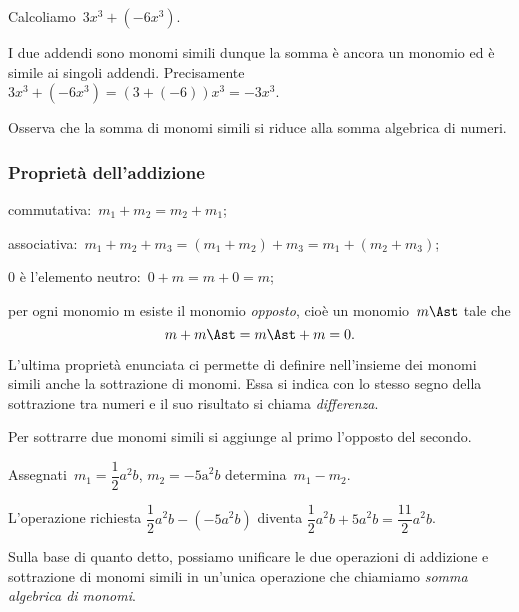 \begin{exrig}
 \begin{esempio}
Calcoliamo~$3x^{3}+(-6x^{3})$.

I due addendi sono monomi simili dunque la somma è ancora un monomio
ed è simile ai singoli addendi. Precisamente
$3x^{3}+(-6x^{3})=(3+(-6))x^{3}=-3x^{3}$.

Osserva che la somma di monomi simili si riduce alla somma algebrica di numeri.
 \end{esempio}
\end{exrig}

\ovalbox{\risolvi \ref{ese:9.24}}

\subsubsection{Proprietà dell'addizione}

\begin{enumeratea}
 \item commutativa:~$m_{{1}}+m_{2}=m_{2}+m_{{1}}$;
 \item associativa:~$m_{{1}}+m_{2}+m_{3}=(m_{{1}}+m_{2})+m_{3}=m_{{1}}+(m_{2}+m_{3})$;
 \item 0 è l'elemento neutro:~$0+m=m+0=m$;
 \item per ogni monomio m esiste il monomio \emph{opposto}, cioè un
 monomio~$m\Ast$ tale che
 \[m + m\Ast = m\Ast +m=0.\]
\end{enumeratea}

L'ultima proprietà enunciata ci permette di definire
nell'insieme dei monomi simili anche la sottrazione di
monomi. Essa si indica con lo stesso segno della sottrazione tra numeri
e il suo risultato si chiama \emph{differenza}.

\osservazione Per sottrarre due monomi simili si aggiunge al primo
l'opposto del secondo.

\begin{exrig}
 \begin{esempio}
Assegnati~$m_{{1}}=\dfrac{1}{2}a^{2}b$, $m_{2}=-\text{5a}^{2}b$ determina~$m_{1} - m_{2}$.

L'operazione richiesta
$\dfrac{1}{2}a^{2}b-(-5a^{2}b)$ diventa
$\dfrac{1}{2}a^{2}b+5a^{2}b=\dfrac{11}{2}a^{2}b$.
 \end{esempio}
\end{exrig}

Sulla base di quanto detto, possiamo unificare le due operazioni di
addizione e sottrazione di monomi simili in un'unica
operazione che chiamiamo \emph{somma algebrica di monomi}.

